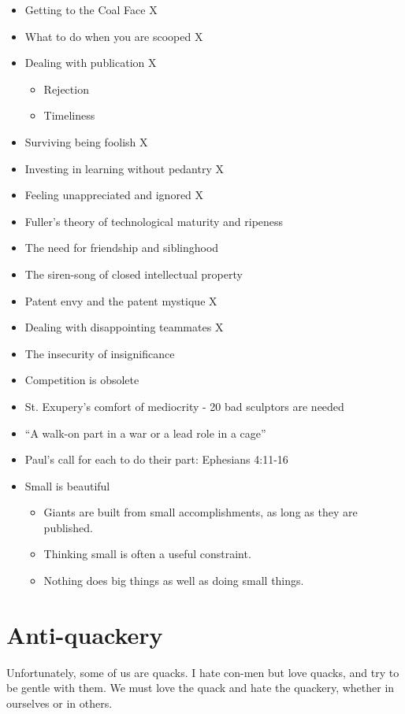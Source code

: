 \documentclass[
	fontsize=10pt, %
	twoside=false, %
	secnumdepth=1, %
]{kaobook}
\begin{document}
\begin{itemize}
\item Getting to the Coal Face X
\item What to do when you are scooped X
\item Dealing with publication X
  \begin{itemize}
\item Rejection
\item Timeliness
\end{itemize}
\item Surviving being foolish X
\item Investing in learning without pedantry X
\item Feeling unappreciated and ignored X
\item Fuller’s theory of technological maturity and ripeness
\item The need for friendship and siblinghood
\item The siren-song of closed intellectual property
\item Patent envy and the patent mystique X
\item Dealing with disappointing teammates X
\item The insecurity of insignificance
\item Competition is obsolete
\item St. Exupery’s comfort of mediocrity - 20 bad sculptors are needed
\item “A walk-on part in a war or a lead role in a cage”
\item Paul’s call for each to do their part: Ephesians 4:11-16
\item Small is beautiful
  \begin{itemize}
\item Giants are built from small accomplishments, as long as they are published.
\item Thinking small is often a useful constraint.
\item Nothing does big things as well as doing small things.
\end{itemize}
\end{itemize}

\section{Anti-quackery}

Unfortunately, some of us are quacks.
I hate con-men but love quacks, and try to be gentle with them.
We must love the quack and hate the quackery, whether in ourselves
or in others.
\end{document}
